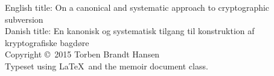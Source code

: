   \newpage
  \thispagestyle{empty} %
  \strut\vfill %
  \begin{flushleft} %
  	English title:  On a canonical and systematic approach to cryptographic subversion \\
  	Danish title: En kanonisk og systematisk tilgang til konstruktion af kryptografiske bagdøre \\
  	\vspace{5mm}
    Copyright \copyright\ 2015 Torben Brandt Hansen \\
    \vspace{5mm}
    Typeset using \LaTeX\ and the memoir document class.\\
  \end{flushleft}
%